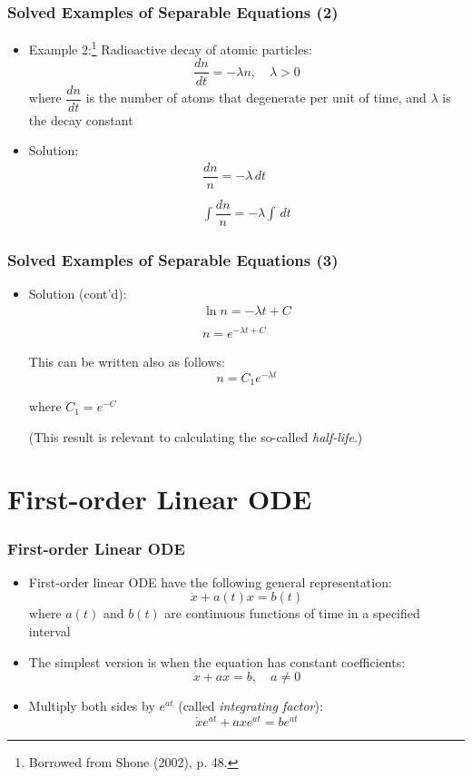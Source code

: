\documentclass[10pt,usenames,dvipsnames]{beamer}
\theoremstyle{definition}
\begin{document}
\begin{frame}[fragile]
	\frametitle{Solved Examples of Separable Equations (2)}
	\begin{itemize}
		\item \textcolor{OliveGreen}{Example 2:}\footnote{Borrowed from Shone (2002), p. 48.} Radioactive decay of atomic particles:
		\[
			\dfrac{dn}{dt} = -\lambda n,\quad \lambda > 0
		\]
		where $ \dfrac{dn}{dt} $ is the number of atoms that degenerate per unit of time, and $ \lambda $ is the decay constant 
		
		\color{red}
		\item Solution:
		\[
			\begin{array}{lcl}
				\dfrac{dn}{n} = -\lambda\, dt\\
				\quad\\
				\displaystyle \int \dfrac{dn}{n} = -\lambda\int\, dt
			\end{array}
		\]
	\end{itemize}	
\end{frame}

\begin{frame}[fragile]
	\frametitle{Solved Examples of Separable Equations (3)}
	\begin{itemize}
		\color{red}
		\item Solution (cont'd): 
		\[
			\begin{array}{lcl}
				\ln n = -\lambda t + C\\
				\quad\\
				n = e^{-\lambda t + C}
			\end{array}	
		\]
		
		This can be written also as follows:
		\[
			n = C_{1}e^{-\lambda t}
		\]
		
		where $ C_{1} = e^{-C} $
		\vspace{1cm}
		
		(This result is relevant to calculating the so-called \textit{half-life}.)
	\end{itemize}
\end{frame}

\section{First-order Linear ODE}
\begin{frame}[fragile]
\frametitle{First-order Linear ODE}
\begin{itemize}
	\item First-order linear ODE have the following general representation:
	\[
		\dot{x} + a(t)x = b(t)
	\]
	where $a(t)$ and $b(t)$ are continuous functions of time in a specified interval
	\item The simplest version is when the equation has constant coefficients:
	\[
		\dot{x} + ax = b, \quad a \neq 0
	\]
	\item Multiply both sides by $e^{at}$ (called \textit{integrating factor}):
	\[
		\dot{x}e^{at} + axe^{at} = be^{at}
	\]
\end{itemize}
\end{frame}
\end{document}

